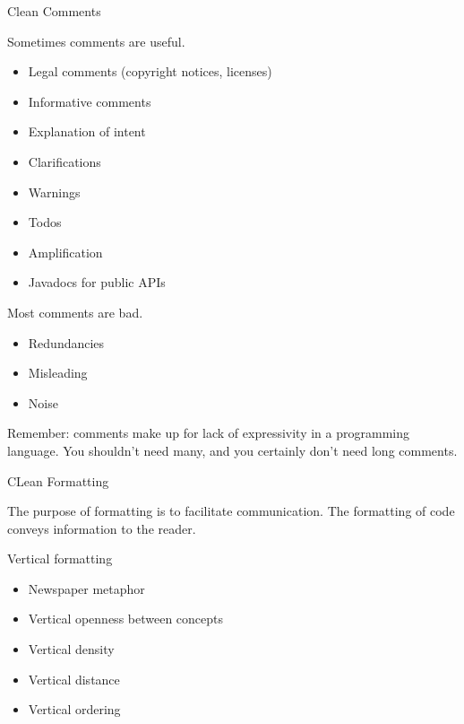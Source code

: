 \documentclass{beamer}
\begin{document}
\begin{frame}[fragile]{Clean Comments}


Sometimes comments are useful.
\begin{itemize}
\item Legal comments (copyright notices, licenses)
\item Informative comments
\item Explanation of intent
\item Clarifications
\item Warnings
\item Todos
\item Amplification
\item Javadocs for public APIs
\end{itemize}

Most comments are bad. 
\begin{itemize}
\item Redundancies
\item Misleading
\item Noise
\end{itemize}

Remember: comments make up for lack of expressivity in a programming language.  You shouldn't need many, and you certainly don't need long comments.

\end{frame}

\begin{frame}[fragile]{CLean Formatting}


The purpose of formatting is to facilitate communication.  The formatting of code conveys information to the reader.

Vertical formatting
\begin{itemize}
\item Newspaper metaphor
\item Vertical openness between concepts
\item Vertical density
\item Vertical distance
\item Vertical ordering
\end{itemize}



\end{frame}
\end{document}
